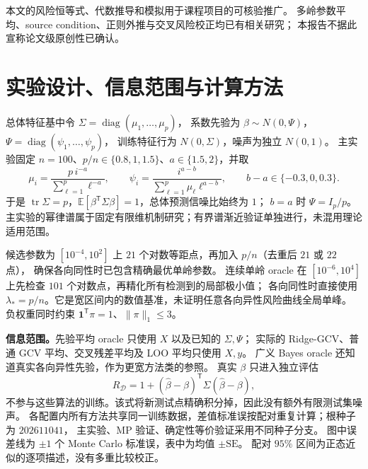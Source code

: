 \documentclass[UTF8,fontset=fandol,11pt,a4paper]{ctexart}
\begin{document}
本文的风险恒等式、代数推导和模拟用于课程项目的可核验推广。
多岭参数平均、source condition、正则外推与交叉风险校正均已有相关研究\cite{zhao,richards,bach,bellec}；
本报告不据此宣称论文级原创性已确认。

\clearpage
\section{实验设计、信息范围与计算方法}
总体特征基中令 $\Sigma=\operatorname{diag}(\mu_1,\ldots,\mu_p)$，
系数先验为 $\beta\sim N(0,\Psi)$，$\Psi=\operatorname{diag}(\psi_1,\ldots,\psi_p)$，
训练特征行为 $N(0,\Sigma)$，噪声为独立 $N(0,1)$。
主实验固定 $n=100$、$p/n\in\{0.8,1,1.5\}$、$a\in\{1.5,2\}$，并取
\begin{equation}\label{eq:experiment_population}
 \mu_i=\frac{p\,i^{-a}}{\sum_{\ell=1}^p\ell^{-a}},\qquad
 \psi_i=\frac{i^{a-b}}{\sum_{\ell=1}^p\mu_\ell\ell^{a-b}},\qquad
 b-a\in\{-0.3,0,0.3\}.
\end{equation}
于是 $\operatorname{tr}\Sigma=p$，$\mathbb E[\beta^\mathsf T\Sigma\beta]=1$，总体预测信噪比始终为 $1$；
$b=a$ 时 $\Psi=I_p/p$。
主实验的幂律谱属于固定有限维机制研究；有界谱渐近验证单独进行，未混用理论适用范围。

候选参数为 $[10^{-4},10^2]$ 上 $21$ 个对数等距点，再加入 $p/n$（去重后 $21$ 或 $22$ 点），
确保各向同性时已包含精确最优单岭参数。
连续单岭 oracle 在 $[10^{-6},10^4]$ 上先检查 $101$ 个对数点，再精化所有检测到的局部极小值；
各向同性时直接使用 $\lambda_*=p/n$。它是宽区间内的数值基准，未证明任意各向异性风险曲线全局单峰。
负权重同时约束 $\boldsymbol1^\mathsf T\pi=1$、$\lVert\pi\rVert_1\le3$。

\textbf{信息范围。}先验平均 oracle 只使用 $X$ 以及已知的 $\Sigma,\Psi$；
实际的 Ridge-GCV、普通 GCV 平均、交叉残差平均及 LOO 平均只使用 $X,y$。
广义 Bayes oracle 还知道真实各向异性先验，作为更宽方法类的参照。
真实 $\beta$ 只进入独立评估
\begin{equation}\label{eq:experiment_evaluation}
 R_{\mathcal D}=1+(\widehat\beta-\beta)^\mathsf T\Sigma(\widehat\beta-\beta),
\end{equation}
不参与这些算法的训练。该式将新测试点精确积分掉，因此没有额外有限测试集噪声。
各配置内所有方法共享同一训练数据，差值标准误按配对重复计算；根种子为 $202611041$，
主实验、MP 验证、确定性等价验证采用不同种子分支。
图中误差线为 $\pm1$ 个 Monte Carlo 标准误，表中为均值 $\pm\mathrm{SE}$。
配对 $95\%$ 区间为正态近似的逐项描述，没有多重比较校正。

\clearpage
\end{document}
